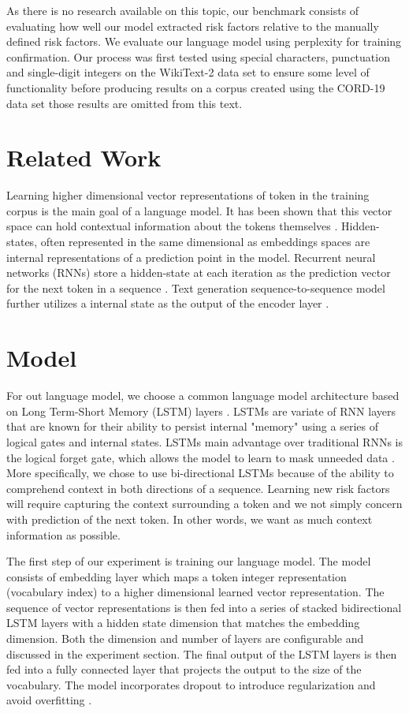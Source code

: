 \documentclass[11pt,a4paper]{article}
\begin{document}
As there is no research available on this topic, our benchmark consists of evaluating how well our model extracted risk factors relative to the manually defined risk factors. We evaluate our language model using perplexity for training confirmation. Our process was first tested using special characters, punctuation and single-digit integers on the WikiText-2 data set \cite{merity2016pointer} to ensure some level of functionality before producing results on a corpus created using the CORD-19 data set those results are omitted from this text.

\section{Related Work}
\label{sec:length}
Learning higher dimensional vector representations of token in the training corpus is the main goal of a language model. It has been shown that this vector space can hold contextual information about the tokens themselves \cite{mikolov2013efficient}. Hidden-states, often represented in the same dimensional as embeddings spaces are internal representations of a prediction point in the model. Recurrent neural networks (RNNs) store a hidden-state at each iteration as the prediction vector for the next token in a sequence \cite{mikolov2010recurrent}. Text generation sequence-to-sequence model further utilizes a internal state as the output of the encoder layer \cite{sutskever2014sequence}. 


\section{Model}
For out language model, we choose a common language model architecture based on Long Term-Short Memory (LSTM) layers \cite{zaremba2014recurrent}. LSTMs are variate of RNN layers that are known for their ability to persist internal "memory" using a series of logical gates and internal states. LSTMs main advantage over traditional RNNs is the logical forget gate, which allows the model to learn to mask unneeded data \cite{gers1999learning}. More specifically, we chose to use bi-directional LSTMs \cite{ma2016end} because of the ability to comprehend context in both directions of a sequence. Learning new risk factors will require capturing the context surrounding a token and we not simply concern with prediction of the next token. In other words, we want as much context information as possible. 

The first step of our experiment is training our language model. The model consists of embedding layer which maps a token integer representation (vocabulary index) to a higher dimensional learned vector representation. The sequence of vector representations is then fed into a series of stacked bidirectional LSTM layers with a hidden state dimension that matches the embedding dimension. Both the dimension and number of layers are configurable and discussed in the experiment section. The final output of the LSTM layers is then fed into a fully connected layer that projects the output to the size of the vocabulary. The model incorporates dropout to introduce regularization and avoid overfitting \cite{srivastava2014dropout}.
\end{document}
